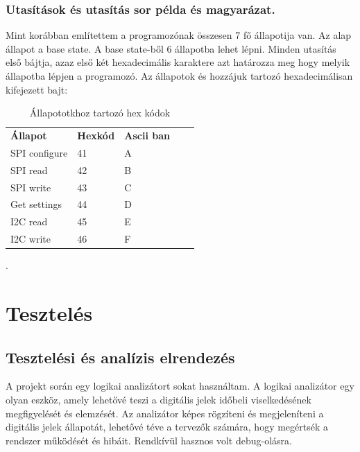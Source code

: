 \documentclass[a4paper,12pt,oneside]{book}
\begin{document}
\subsection{Utasítások és utasítás sor példa és magyarázat.}
Mint korábban említettem a programozónak összesen 7 fő állapotija van. Az alap állapot a base state. A base state-ből 6 állapotba lehet lépni. 
Minden utasítás első bájtja, azaz első két hexadecimális karaktere azt határozza meg hogy melyik állapotba lépjen a programozó.
Az állapotok és hozzájuk tartozó hexadecimálisan kifejezett bajt:
\begin{table}[H]
\centering 
\begin{tabular}{lllll}
\textbf{Állapot}                      & \textbf{Hexkód}            & \textbf{Ascii ban}        &  &  \\
\cellcolor[HTML]{D9D9D9}SPI configure & \cellcolor[HTML]{D9D9D9}41 & \cellcolor[HTML]{D9D9D9}A &  &  \\
SPI read                              & 42                         & B                         &  &  \\
\cellcolor[HTML]{D9D9D9}SPI write     & \cellcolor[HTML]{D9D9D9}43 & \cellcolor[HTML]{D9D9D9}C &  &  \\
Get settings                          & 44                         & D                         &  &  \\
\cellcolor[HTML]{D9D9D9}I2C read      & \cellcolor[HTML]{D9D9D9}45 & \cellcolor[HTML]{D9D9D9}E &  &  \\
I2C write                             & 46                         & F                         &  & 
\end{tabular}
\caption{Állapototkhoz tartozó hex kódok}.
\label{Állapototkhoz tartozó hex kódok} 
\end{table}

\chapter{Tesztelés}

\section{Tesztelési és analízis elrendezés}
A projekt során egy logikai analizátort sokat használtam. A logikai analizátor egy olyan eszköz, amely lehetővé teszi a digitális jelek időbeli viselkedésének megfigyelését és elemzését. Az analizátor képes rögzíteni és megjeleníteni a digitális jelek állapotát, lehetővé téve a tervezők számára, hogy megértsék a rendszer működését és hibáit. Rendkívül hasznos volt debug-olásra.
\end{document}
